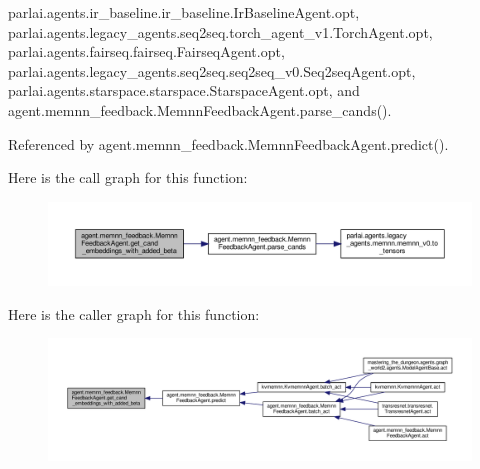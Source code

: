 parlai.\+agents.\+ir\+\_\+baseline.\+ir\+\_\+baseline.\+Ir\+Baseline\+Agent.\+opt, parlai.\+agents.\+legacy\+\_\+agents.\+seq2seq.\+torch\+\_\+agent\+\_\+v1.\+Torch\+Agent.\+opt, parlai.\+agents.\+fairseq.\+fairseq.\+Fairseq\+Agent.\+opt, parlai.\+agents.\+legacy\+\_\+agents.\+seq2seq.\+seq2seq\+\_\+v0.\+Seq2seq\+Agent.\+opt, parlai.\+agents.\+starspace.\+starspace.\+Starspace\+Agent.\+opt, and agent.\+memnn\+\_\+feedback.\+Memnn\+Feedback\+Agent.\+parse\+\_\+cands().



Referenced by agent.\+memnn\+\_\+feedback.\+Memnn\+Feedback\+Agent.\+predict().

Here is the call graph for this function\+:
\nopagebreak
\begin{figure}[H]
\begin{center}
\leavevmode
\includegraphics[width=350pt]{classagent_1_1memnn__feedback_1_1MemnnFeedbackAgent_a4f0769934f608795f6d0bd6fa5d19a17_cgraph}
\end{center}
\end{figure}
Here is the caller graph for this function\+:
\nopagebreak
\begin{figure}[H]
\begin{center}
\leavevmode
\includegraphics[width=350pt]{classagent_1_1memnn__feedback_1_1MemnnFeedbackAgent_a4f0769934f608795f6d0bd6fa5d19a17_icgraph}
\end{center}
\end{figure}
\mbox{\label{classagent_1_1memnn__feedback_1_1MemnnFeedbackAgent_a1d616b4215665efb7df23f0477850827}} 

